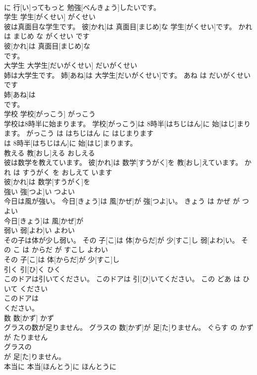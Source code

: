 \documentclass[8pt]{extreport}
\begin{document}
\begin{CJK}{UTF8}{min}
\\	に 行[い]ってもっと 勉強[べんきょう]したいです。			
\\	学生	学生[がくせい]	がくせい	
\\	彼は真面目な学生です。	彼[かれ]は 真面目[まじめ]な 学生[がくせい]です。	かれ は まじめ な がくせい です	
\\	彼[かれ]は 真面目[まじめ]な
\\	です。			
\\	大学生	大学生[だいがくせい]	だいがくせい	
\\	姉は大学生です。	姉[あね]は 大学生[だいがくせい]です。	あね は だいがくせい です	
\\	姉[あね]は
\\	です。			
\\	学校	学校[がっこう]	がっこう	
\\	学校は8時半に始まります。	学校[がっこう]は 8時半[はちじはん]に 始[はじ]まります。	がっこう は はちじはん に はじまります	
\\	は 8時半[はちじはん]に 始[はじ]まります。			
\\	教える	教[おし]える	おしえる	
\\	彼は数学を教えています。	彼[かれ]は 数学[すうがく]を 教[おし]えています。	かれ は すうがく を おしえて います	
\\	彼[かれ]は 数学[すうがく]を
\\	強い	強[つよ]い	つよい	
\\	今日は風が強い。	今日[きょう]は 風[かぜ]が 強[つよ]い。	きょう は かぜ が つよい	
\\	今日[きょう]は 風[かぜ]が
\\	弱い	弱[よわ]い	よわい	
\\	その子は体が少し弱い。	その 子[こ]は 体[からだ]が 少[すこ]し 弱[よわ]い。	その こ は からだ が すこし よわい	
\\	その 子[こ]は 体[からだ]が 少[すこ]し
\\	引く	引[ひ]く	ひく	
\\	このドアは引いてください。	このドアは 引[ひ]いてください。	この どあ は ひいて ください	
\\	このドアは
\\	ください。			
\\	数	数[かず]	かず	
\\	グラスの数が足りません。	グラスの 数[かず]が 足[た]りません。	ぐらす の かず が たりません	
\\	グラスの
\\	が 足[た]りません。			
\\	本当に	本当[ほんとう]に	ほんとうに	

\end{CJK}
\end{document}
